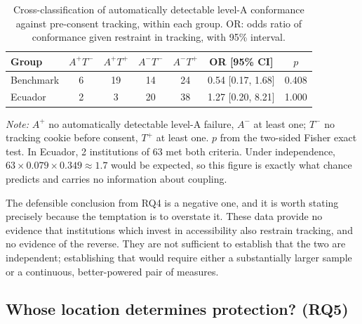 \documentclass[pdflatex,sn-basic,Numbered,iicol]{sn-jnl}
\theoremstyle{thmstyleone}
\theoremstyle{thmstyletwo}
\theoremstyle{thmstylethree}
\begin{document}
\begin{table}[htbp]
	\centering
	\caption{Cross-classification of automatically detectable level-A conformance against pre-consent tracking, within each group. OR: odds ratio of conformance given restraint in tracking, with 95\% interval.}\label{tab:joint}
	\small
	\begin{tabular}{@{}lcccccc@{}}
		\toprule
		\textbf{Group} & $A^{+}T^{-}$ & $A^{+}T^{+}$ & $A^{-}T^{-}$ & $A^{-}T^{+}$ & \textbf{OR [95\% CI]} & \textbf{$p$} \\
		\midrule
		Benchmark & 6 & 19 & 14 & 24 & 0.54 [0.17, 1.68] & 0.408 \\
		Ecuador & 2 & 3 & 20 & 38 & 1.27 [0.20, 8.21] & 1.000 \\
		\bottomrule
	\end{tabular}
	\par\vspace{3pt}
	\footnotesize\RaggedRight\textit{Note:} $A^{+}$ no automatically detectable level-A failure, $A^{-}$ at least one; $T^{-}$ no tracking cookie before consent, $T^{+}$ at least one. $p$ from the two-sided Fisher exact test. In Ecuador, 2 institutions of 63 met both criteria. Under independence, $63 \times 0.079 \times 0.349 \approx 1.7$ would be expected, so this figure is exactly what chance predicts and carries no information about coupling.
\end{table}

The defensible conclusion from RQ4 is a negative one, and it is worth stating precisely because the temptation is to overstate it. These data provide no evidence that institutions which invest in accessibility also restrain tracking, and no evidence of the reverse. They are not sufficient to establish that the two are independent; establishing that would require either a substantially larger sample or a continuous, better-powered pair of measures.

\subsection{Whose location determines protection? (RQ5)}\label{sec:results-vantage}
\end{document}

